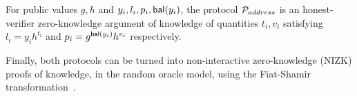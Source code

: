 \begin{lemma}\label{thm:user-proto}
    For public values $g, h$ and $y_i, l_i, p_i, \mathsf{bal}(y_i)$, the protocol
    $\mathcal{P}_{address}$ is an honest-verifier zero-knowledge argument of
    knowledge of quantities $t_i, v_i$ satisfying $l_i = y_ih^{t_i}$ and $p_i =
    g^{\mathsf{bal}(y_i)}h^{v_i}$ respectively.
\end{lemma}

Finally, both protocols can be turned into non-interactive zero-knowledge
(NIZK) proofs of knowledge, in the random oracle model, using the
Fiat-Shamir transformation~\cite{C:FiaSha86}.
